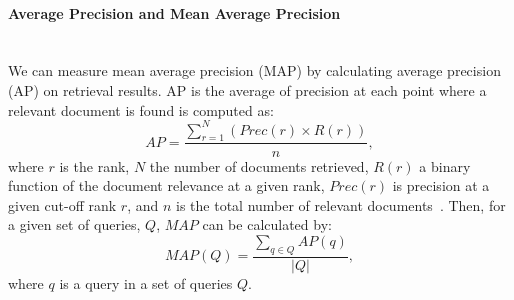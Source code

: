 \paragraph{Average Precision and Mean Average Precision}
\ \\
We can measure mean average precision (MAP) by calculating average precision (AP) on retrieval results. AP is the average of precision at each point where a relevant document is found is computed as:
\begin{equation}
AP=\frac{\sum\limits_{r=1}^{N}(Prec(r)\times R(r))}{n},
\end{equation}
\noindent
where $ r $ is the rank, $ N $ the number of documents retrieved, $ R(r) $ a binary function of the document relevance at a given rank, $ Prec(r) $ is precision at a given cut-off rank $ r $, and $ n $ is the total number of relevant documents~\citep[p.159]{manning2008introduction}.
Then, for a given set of queries, $ Q $, $ MAP $ can be calculated by:
\begin{equation}
MAP(Q)=\frac{\sum\limits_{q\in Q}AP(q)}{|Q|},
\end{equation}
\noindent
where $ q $ is a query in a set of queries $ Q $.